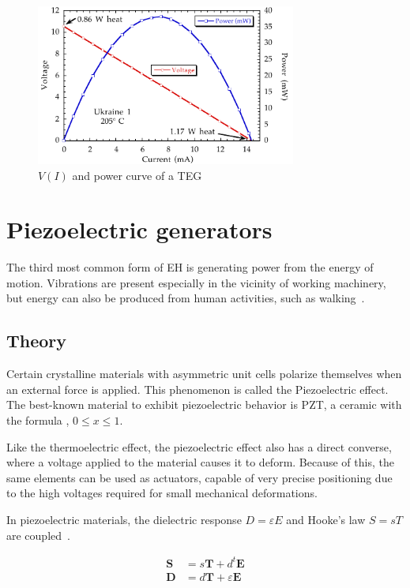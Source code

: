 \documentclass[a4paper,10pt]{article}
\renewcommand{\vec}{\mathbf}
\begin{document}
\begin{figure}[h]
\centering
 \includegraphics[height=150pt]{./Slike/TEG-curve}
\caption{$V(I)$ and power curve of a \ac{TEG}~\cite{teg-curve}}
\label{fig:teg-curve}
\end{figure}

\section{Piezoelectric generators}

The third most common form of \ac{EH} is generating power from the energy of motion. Vibrations are present especially in the vicinity of working machinery, but energy can also be produced from human activities, such as walking~\cite{piezo-shoe-ieee}. 

\subsection{Theory}

Certain crystalline materials with asymmetric unit cells polarize themselves when an external force is applied. This phenomenon is called the Piezoelectric effect. The best-known material to exhibit piezoelectric behavior is \ac{PZT}, a ceramic with the formula , $0\leq x \leq 1$.


Like the thermoelectric effect, the piezoelectric effect also has a direct converse, where a voltage applied to the material causes it to deform. Because of this, the same elements can be used as actuators, capable of very precise positioning due to the high voltages required for small mechanical deformations. 

In piezoelectric materials, the dielectric response $D = \varepsilon E$ and Hooke's law $S = sT$ are coupled~\cite{wiki:piezo}. 

\begin{align}
 \vec S &= s \vec T + d^t \vec E \\
 \vec D &= d \vec T + \varepsilon \vec E
\end{align}
\end{document}
